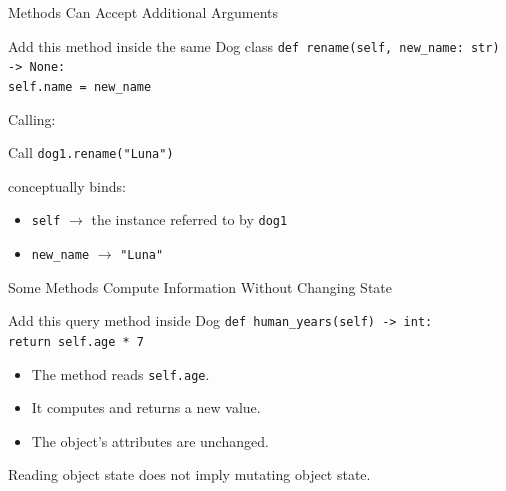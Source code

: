 \documentclass[aspectratio=169,10pt]{beamer}
\begin{document}
\begin{frame}{Methods Can Accept Additional Arguments}
  \begin{block}{Add this method inside the same Dog class}
    \texttt{def rename(self, new\_name: str) -> None:}\\
    \hspace*{0.20in}\texttt{self.name = new\_name}
  \end{block}

  Calling:
  \begin{block}{Call}
    \texttt{dog1.rename("Luna")}
  \end{block}

  conceptually binds:
  \begin{itemize}
    \item \texttt{self} $\rightarrow$ the instance referred to by \texttt{dog1}
    \item \texttt{new\_name} $\rightarrow$ \texttt{"Luna"}
  \end{itemize}
\end{frame}


\begin{frame}{Some Methods Compute Information Without Changing State}
  \begin{block}{Add this query method inside Dog}
    \texttt{def human\_years(self) -> int:}\\
    \hspace*{0.20in}\texttt{return self.age * 7}
  \end{block}

  \begin{itemize}
    \item The method reads \texttt{self.age}.
    \item It computes and returns a new value.
    \item The object's attributes are unchanged.
  \end{itemize}

  \begin{keyidea}
    Reading object state does not imply mutating object state.
  \end{keyidea}
\end{frame}
\end{document}
